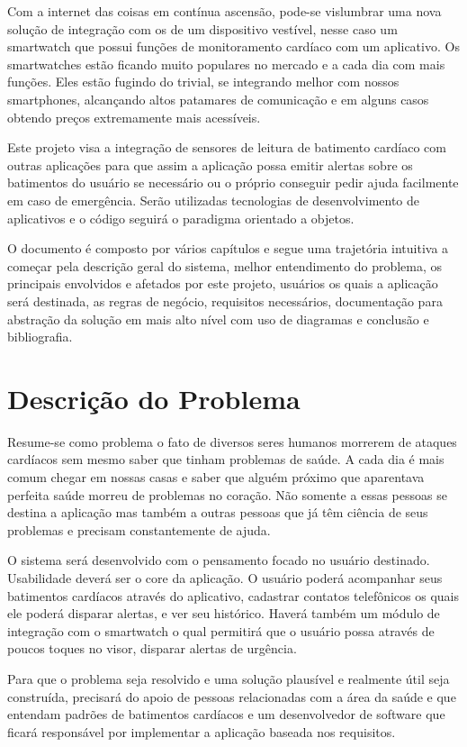 \documentclass[
	12pt,				%
	openright,			%
	a4paper,			%
	oneside, 
	chapter=TITLE,		%
	english,			%
	brazil				%
	]{abntex2}
\begin{document}
Com a internet das coisas em contínua ascensão, pode-se vislumbrar uma nova solução de integração com os de um dispositivo vestível, nesse caso um smartwatch que possui funções de monitoramento cardíaco com um aplicativo. Os smartwatches estão ficando muito populares no mercado e a cada dia com mais funções. Eles estão fugindo do trivial, se integrando melhor com nossos smartphones, alcançando altos patamares de comunicação e em alguns casos obtendo preços extremamente mais acessíveis.

Este projeto visa a integração de sensores de leitura de batimento cardíaco com outras aplicações para que assim a aplicação possa emitir alertas sobre os batimentos do usuário se necessário ou o próprio conseguir pedir ajuda facilmente em caso de emergência. Serão utilizadas tecnologias de desenvolvimento de aplicativos e o código seguirá o paradigma orientado a objetos.

O documento é composto por vários capítulos e segue uma trajetória intuitiva a começar pela descrição geral do sistema, melhor entendimento do problema, os principais envolvidos e afetados por este projeto, usuários os quais a aplicação será destinada, as regras de negócio, requisitos necessários, documentação para abstração da solução em mais alto nível com uso de diagramas e conclusão e bibliografia.

\chapter{Descrição do Problema}
Resume-se como problema o fato de diversos seres humanos morrerem de ataques cardíacos sem mesmo saber que tinham problemas de saúde. A cada dia é mais comum chegar em nossas casas e saber que alguém próximo que aparentava perfeita saúde morreu de problemas no coração. Não somente a essas pessoas se destina a aplicação mas também a outras pessoas que já têm ciência de seus problemas e precisam constantemente de ajuda.

O sistema será desenvolvido com o pensamento focado no usuário destinado. Usabilidade deverá ser o core da aplicação. O usuário poderá acompanhar seus batimentos cardíacos através do aplicativo, cadastrar contatos telefônicos os quais ele poderá disparar alertas, e ver seu histórico. Haverá também um módulo de integração com o smartwatch o qual permitirá que o usuário possa através de poucos toques no visor, disparar alertas de urgência.

Para que o problema seja resolvido e uma solução plausível e realmente útil seja construída, precisará do apoio de pessoas relacionadas com a área da saúde e que entendam padrões de batimentos cardíacos e um desenvolvedor de software que ficará responsável por implementar a aplicação baseada nos requisitos.
\end{document}

